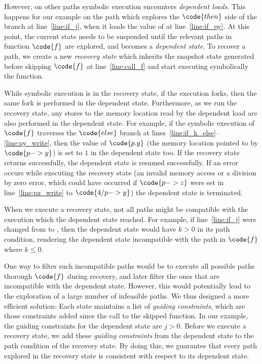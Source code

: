 However, on other paths symbolic execution encounters
\textit{dependent loads}.  This happens for our example on the path
which explores the $\code{then}$ side of the branch at
line~\ref{line:if_j}, when it loads the value of  at
line~\ref{line:if_py}. At this point, the current state needs to be
suspended until the relevant paths in function $\code{f}$ are
explored, and becomes a \textit{dependent state}. To recover a path,
we create a new \textit{recovery state} which inherits the snapshot
state generated before skipping $\code{f}$ at line~\ref{line:call_f}
and start executing symbolically the function.

While symbolic execution is in the recovery state, if the execution
forks, then the same fork is performed in the dependent state.
Furthermore, as we run the recovery state, any stores to the memory
location read by the dependent load are also performed in the
dependent state. For example, if the symbolic execution of $\code{f}$
traverses the $\code{else}$ branch at
lines~\ref{line:if_k_else}--\ref{line:py_write}, then the value of
$\code{p.y}$ (the memory location pointed to by $\code{p->y}$) is set
to $1$ in the dependent state too. If the recovery state returns
successfully, the dependent state is resumed successfully. If an error
occurs while executing the recovery state (\eg an invalid memory
access or a division by zero error, which could have occurred if
$\code{p->z}$ were set in line~\ref{line:pz_write} to $\code{4/p->y}$)
the dependent state is terminated.

When we execute a recovery state, not all paths might be compatible
with the execution which the dependent state reached. For example, if
line~\ref{line:if_j} were changed from  to , then the dependent state would have $k>0$ in its path
condition, rendering the dependent state incompatible with the path in
$\code{f}$ where $k\le0$.

One way to filter such incompatible paths would be to execute all
possible paths thorough $\code{f}$ during recovery, and later filter
the ones that are incompatible with the dependent state. However, this
would potentially lead to the exploration of a large number of
infeasible paths. We thus designed a more efficient solution: Each
state maintains a list of \textit{guiding constraints}, which are
those constraints added since the call to the skipped function. In our
example, the guiding constraints for the dependent state are
$j>0$. Before we execute a recovery state, we add these
\textit{guiding constraints} from the dependent state to the path
condition of the recovery state. By doing this, we guarantee that
every path explored in the recovery state is consistent with respect
to its dependent state.

